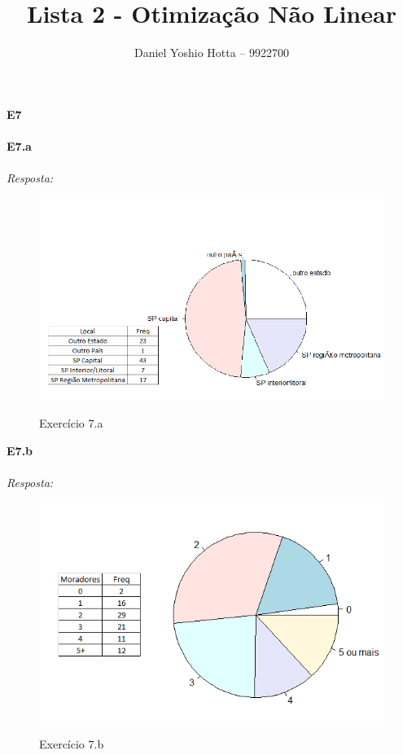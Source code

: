 \documentclass{article}
\begin{document}
	
	\title{Lista 2 - Otimização Não Linear}
	\author{Daniel Yoshio Hotta – 9922700}
	
	\maketitle	
	
	\textbf {E7} 
	\\ \\
	
	\textbf {E7.a} 
	\\ \\
	\textit {Resposta:} \\
    
    
    \begin{figure}[h]
    	\caption{Exercício 7.a}
    	\centering %
    	\includegraphics[width=14cm]{A.png} %
    	\label{figura: Item A}
	\end{figure}

    \textbf {E7.b} 
    \\ \\
    \textit {Resposta:} \\
    
    
    \begin{figure}[h]
    	\caption{Exercício 7.b}
    	\centering %
    	\includegraphics[width=14cm]{B.png} %
    	\label{figura: Item B}
    \end{figure}
	
\end{document}
